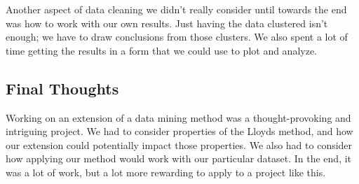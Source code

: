 Another aspect of data cleaning we didn't really consider until towards the end
was how to work with our own results.
Just having the data clustered isn't enough; we have to draw conclusions from those clusters.
We also spent a lot of time getting the results in a form that we could use to plot and analyze.

\subsection{Final Thoughts}

Working on an extension of a data mining method was a thought-provoking and intriguing project.
We had to consider properties of the Lloyds method,
and how our extension could potentially impact those properties.
We also had to consider how applying our method would work with our particular dataset.
In the end, it was a lot of work, but a lot more rewarding to apply to a project like this.
